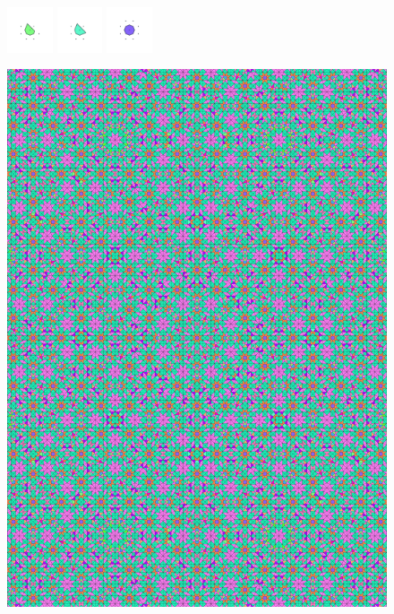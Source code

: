 \documentclass[text.tex]{subfiles}
\begin{document}
\begin{figure}[h!]
\includegraphics[width=0.12\textwidth]{img/results/octagon/octagon_226776_(-3_5alpha_4)_014.pdf}
\includegraphics[width=0.12\textwidth]{img/results/octagon/octagon_226776_(-3_5alpha_4)_015.pdf}
\includegraphics[width=0.12\textwidth]{img/results/octagon/octagon_226776_(-3_5alpha_4)_016.pdf}
\end{figure}

\begin{figure}[h!]
\centering
\includegraphics[width=1\textwidth]{img/results/octagon/quasi_polygon-octagon_226776_(-3_5alpha_4).pdf}
\end{figure}
\end{document}
